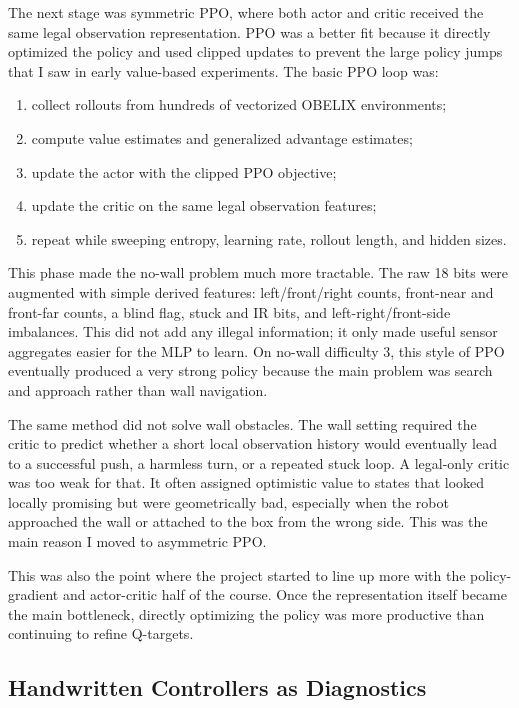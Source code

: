 \documentclass[11pt, oneside]{article}   	%
\begin{document}
The next stage was symmetric PPO, where both actor and critic received the same legal
observation representation. PPO was a better fit because it directly optimized the
policy and used clipped updates to prevent the large policy jumps that I saw in early
value-based experiments. The basic PPO loop was:
\begin{enumerate}[leftmargin=1.5em]
  \item collect rollouts from hundreds of vectorized OBELIX environments;
  \item compute value estimates and generalized advantage estimates;
  \item update the actor with the clipped PPO objective;
  \item update the critic on the same legal observation features;
  \item repeat while sweeping entropy, learning rate, rollout length, and hidden sizes.
\end{enumerate}

This phase made the no-wall problem much more tractable. The raw 18 bits were augmented
with simple derived features: left/front/right counts, front-near and front-far counts,
a blind flag, stuck and IR bits, and left-right/front-side imbalances. This did not add
any illegal information; it only made useful sensor aggregates easier for the MLP to
learn. On no-wall difficulty 3, this style of PPO eventually produced a very strong
policy because the main problem was search and approach rather than wall navigation.

The same method did not solve wall obstacles. The wall setting required the critic to
predict whether a short local observation history would eventually lead to a successful
push, a harmless turn, or a repeated stuck loop. A legal-only critic was too weak for
that. It often assigned optimistic value to states that looked locally promising but were
geometrically bad, especially when the robot approached the wall or attached to the box
from the wrong side. This was the main reason I moved to asymmetric PPO.

This was also the point where the project started to line up more with the policy-gradient
and actor-critic half of the course. Once the representation itself became the main
bottleneck, directly optimizing the policy was more productive than continuing to refine
Q-targets.

\subsection{Handwritten Controllers as Diagnostics}
\end{document}
